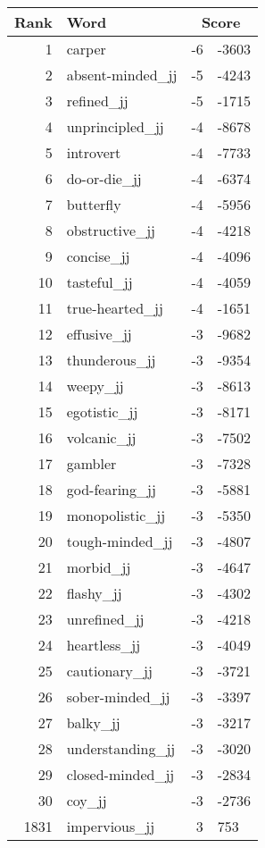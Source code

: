 \begin{longtable}[!htbp]{| rlr@{.}l |}
    \hline
    \textbf{Rank} & \textbf{Word} & \multicolumn{2}{c|}{\textbf{Score}} \\
    \hline
    \endhead
    1 & carper & -6 & -3603 \\
    2 & absent-minded\_jj & -5 & -4243 \\
    3 & refined\_jj & -5 & -1715 \\
    4 & unprincipled\_jj & -4 & -8678 \\
    5 & introvert & -4 & -7733 \\
    6 & do-or-die\_jj & -4 & -6374 \\
    7 & butterfly & -4 & -5956 \\
    8 & obstructive\_jj & -4 & -4218 \\
    9 & concise\_jj & -4 & -4096 \\
    10 & tasteful\_jj & -4 & -4059 \\
    11 & true-hearted\_jj & -4 & -1651 \\
    12 & effusive\_jj & -3 & -9682 \\
    13 & thunderous\_jj & -3 & -9354 \\
    14 & weepy\_jj & -3 & -8613 \\
    15 & egotistic\_jj & -3 & -8171 \\
    16 & volcanic\_jj & -3 & -7502 \\
    17 & gambler & -3 & -7328 \\
    18 & god-fearing\_jj & -3 & -5881 \\
    19 & monopolistic\_jj & -3 & -5350 \\
    20 & tough-minded\_jj & -3 & -4807 \\
    21 & morbid\_jj & -3 & -4647 \\
    22 & flashy\_jj & -3 & -4302 \\
    23 & unrefined\_jj & -3 & -4218 \\
    24 & heartless\_jj & -3 & -4049 \\
    25 & cautionary\_jj & -3 & -3721 \\
    26 & sober-minded\_jj & -3 & -3397 \\
    27 & balky\_jj & -3 & -3217 \\
    28 & understanding\_jj & -3 & -3020 \\
    29 & closed-minded\_jj & -3 & -2834 \\
    30 & coy\_jj & -3 & -2736 \\
    1831 & impervious\_jj & 3 & 753 \\

\end{longtable}
